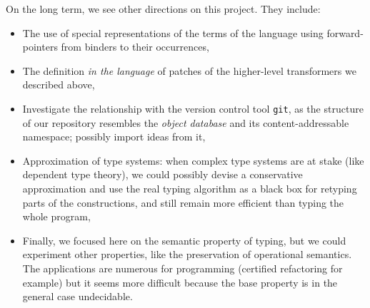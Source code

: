 \documentclass[twoside,a4paper,12pt]{article}
\begin{document}
On the long term, we see other directions on this project. They
include:
\begin{itemize}
\item The use of special representations of the terms of the language
  using forward-pointers from binders to their occurrences,
\item The definition \emph{in the language} of patches of the
  higher-level transformers we described above,
\item Investigate the relationship with the version control tool
  \texttt{git}, as the structure of our repository resembles the
  \emph{object database} and its content-addressable namespace;
  possibly import ideas from it,
\item Approximation of type systems: when complex type systems are at
  stake (like dependent type theory), we could possibly devise a
  conservative approximation and use the real typing algorithm as a
  black box for retyping parts of the constructions, and still remain
  more efficient than typing the whole program,
\item Finally, we focused here on the semantic property of typing, but
  we could experiment other properties, like the preservation of
  operational semantics. The applications are numerous for programming
  (certified refactoring for example) but it seems more difficult
  because the base property is in the general case undecidable.
\end{itemize}








\end{document}
